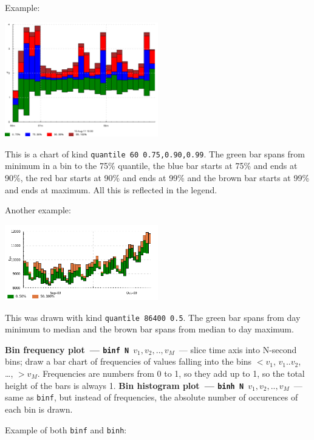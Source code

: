 \documentclass{article}
\begin{document}
Example:

\centerline{\includegraphics[width=0.5\textwidth]{pics/tplot/tplot-rmq-latency-2.png}}

This is a chart of kind \texttt{quantile 60 0.75,0.90,0.99}. The green bar spans from minimum in a bin to the 75\% quantile, the blue bar starts at 75\% and ends at 90\%, the red bar starts at 90\% and ends at 99\% and the brown bar starts at 99\% and ends at maximum. All this is reflected in the legend.

Another example:

\centerline{\includegraphics[width=0.5\textwidth]{pics/tplot/median.png}}

This was drawn with kind \texttt{quantile 86400 0.5}. The green bar spans from day minimum to median and the brown bar spans from median to day maximum.

\pagebreak
\noindent
\textbf{Bin frequency plot~--- \texttt{binf N $v_1,v_2,..,v_M$}}~--- slice time axis into N-second bins; draw a bar chart of frequencies of values falling into the bins $<v_1$, $v_1..v_2$, \ldots, $>v_M$. Frequencies are numbers from 0 to 1, so they add up to 1, so the total height of the bars is always 1.
\noindent
\textbf{Bin histogram plot~--- \texttt{binh N $v_1,v_2,..,v_M$}}~--- same as \texttt{binf}, but instead of frequencies, the absolute number of occurences of each bin is drawn.

Example of both \texttt{binf} and \texttt{binh}:
\end{document}
